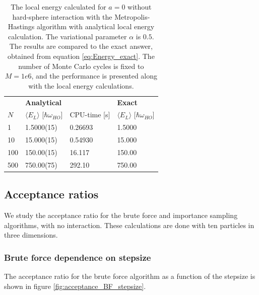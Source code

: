 \documentclass[norsk,a4paper,12pt]{article}
\begin{document}
\begin{table} [H]
	\centering
	\caption{The local energy calculated for $a=0$  without hard-sphere interaction with the Metropolis-Hastings algorithm with analytical local energy calculation. The variational parameter $\alpha$ is $0.5$. The results are compared to the exact answer, obtained from equation \ref{eq:Energy_exact}. The number of Monte Carlo cycles is fixed to $M=1e6$, and the performance is presented along with the local energy calculations.}
	\begin{tabularx}{\textwidth}{X|XX|X} \hline
		\label{tab:ISmet}
		& \textbf{Analytical}  & & \textbf{Exact}\\
		$N$ & $\langle E_L\rangle$ [$\hbar\omega_{HO}$] & CPU-time [s] & $\langle E_L\rangle$ [$\hbar\omega_{HO}$]\\ \hline
		1 & 1.5000(15) & 0.26693  & 1.5000 \\
		10 & 15.000(15) &  0.54930 & 15.000 \\
		100 & 150.00(15) & 16.117 & 150.00 \\
		500 & 750.00(75) & 292.10 & 750.00 \\ \hline
	\end{tabularx}
\end{table}


\subsection{Acceptance ratios}
We study the acceptance ratio for the brute force and importance sampling algorithms, with no interaction. These calculations are done with ten particles in three dimensions.

\subsubsection{Brute force dependence on stepsize}
The acceptance ratio for the brute force algorithm as a function of the stepsize is shown in figure \ref{fig:acceptance_BF_stepsize}. 
\end{document}
